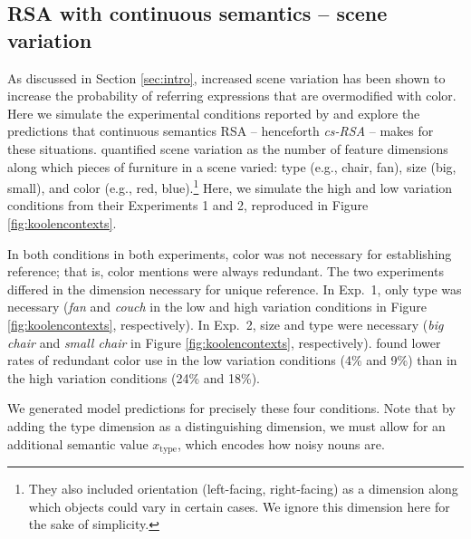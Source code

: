 \documentclass[11pt]{article}
\newcommand{\figref}[1]{Figure \ref{#1}}
\newcommand{\sectionref}[1]{Section \ref{#1}}
\begin{document}
\subsection{RSA with continuous semantics -- scene variation}
\label{sec:modelkoolen}

As discussed in \sectionref{sec:intro}, increased scene variation has been shown to increase the probability of referring expressions that are overmodified with color. Here we simulate the experimental conditions reported by  and explore the predictions that continuous semantics RSA  -- henceforth \emph{cs-RSA} -- makes for these situations.   quantified scene variation as the number of feature dimensions along which pieces of furniture in a scene varied: type (e.g., chair, fan), size (big, small), and color (e.g., red, blue).\footnote{They also included orientation (left-facing, right-facing) as a dimension along which objects could vary in certain cases. We ignore this dimension here for the sake of simplicity.} Here, we  simulate the high and low variation conditions from their Experiments 1 and 2, reproduced in \figref{fig:koolencontexts}. 

In both conditions in both experiments, color was not necessary for establishing reference; that is, color mentions were always redundant. The two experiments differed in the dimension necessary for unique reference. In Exp.~1, only type was necessary (\emph{fan} and \emph{couch} in the low and high variation conditions in \figref{fig:koolencontexts}, respectively). In Exp.~2, size and type were necessary (\emph{big chair} and \emph{small chair} in \figref{fig:koolencontexts}, respectively).  found lower rates of redundant color use in the low variation conditions (4\% and 9\%) than in the high variation conditions (24\% and 18\%).

We generated model predictions for precisely these four conditions. Note that by adding the type dimension as a distinguishing dimension, we must allow for an additional semantic value $x_{\text{type}}$, which encodes how noisy nouns are.
\end{document}
